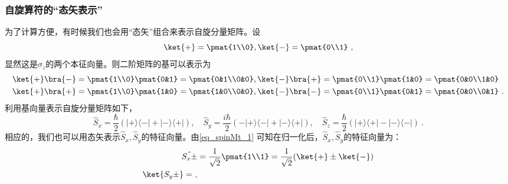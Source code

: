 \subsubsection{自旋算符的“态矢表示”}
为了计算方便，有时候我们也会用“态矢”组合来表示自旋分量矩阵。设
\begin{equation}
\ket{+}=\pmat{1\\0},\ket{-}=\pmat{0\\1}~,
\end{equation}
显然这是$\hat \sigma_z$的两个本征向量。则二阶矩阵的基可以表示为
\begin{equation}
\begin{aligned}
\ket{+}\bra{-}&=\pmat{1\\0}\pmat{0&1}=\pmat{0&1\\0&0},\ket{-}\bra{+}=\pmat{0\\1}\pmat{1&0}=\pmat{0&0\\1&0}\\
\ket{+}\bra{+}&=\pmat{1\\0}\pmat{1&0}=\pmat{1&0\\0&0},\ket{-}\bra{-}=\pmat{0\\1}\pmat{0&1}=\pmat{0&0\\0&1}~.
\end{aligned}
\end{equation}
利用基向量表示自旋分量矩阵如下，
\begin{equation}
\hat S_{x}=\frac{\hbar}{2}(|+\rangle\langle-|+|-\rangle\langle+|), \quad \hat S_{y}=\frac{i \hbar}{2}(-|+\rangle\langle-|+|-\rangle\langle+|), \quad 
\hat S_{z}=\frac{\hbar}{2}(|+\rangle\langle+|-|-\rangle\langle-|)~.
\end{equation}
相应的，我们也可以用态矢表示$\hat S_x,\hat S_y$的特征向量。由\autoref{eq_spinMt_1} 可知在归一化后，$\hat S_x,\hat S_y$的特征向量为：
\begin{equation}
\begin{aligned}
\hat {S_x\pm}&=\frac{1}{\sqrt{2}}\pmat{1\\1}=\frac{1}{\sqrt{2}}(\ket{+}\pm \ket{-})\\
\ket{S_y\pm}=
~,
\end{aligned}
\end{equation}

